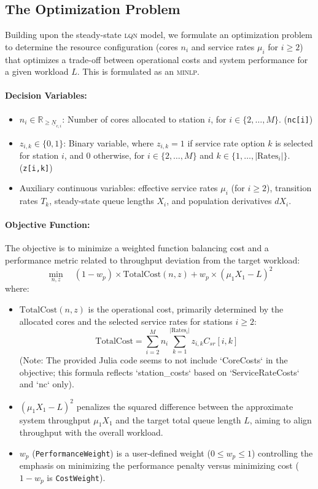 \documentclass{article}
\newcommand{\minlp}{\textsc{minlp}}
\newcommand{\lqn}{\textsc{lqn}}
\begin{document}
\subsection{The Optimization Problem}
\label{subsec:optimization}

Building upon the steady-state \lqn{} model, we formulate an optimization problem to determine the resource configuration (cores \(n_i\) and service rates \(\mu_i\) for \(i \ge 2\)) that optimizes a trade-off between operational costs and system performance for a given workload \(L\). This is formulated as an \minlp{}.

\paragraph{Decision Variables:}
\begin{itemize}
    \item \(n_i \in \mathbb{R}_{\ge \underline{N}_{c,i}}\): Number of cores allocated to station \(i\), for \(i \in \{2, \dots, M\}\). (\texttt{nc[i]})
    \item \(z_{i,k} \in \{0, 1\}\): Binary variable, where \(z_{i,k}=1\) if service rate option \(k\) is selected for station \(i\), and 0 otherwise, for \(i \in \{2, \dots, M\}\) and \(k \in \{1, \dots, |\text{Rates}_i|\}\). (\texttt{z[i,k]})
    \item Auxiliary continuous variables: effective service rates \(\mu_i\) (for \(i \ge 2\)), transition rates \(T_k\), steady-state queue lengths \(X_i\), and population derivatives \(dX_i\).
\end{itemize}

\paragraph{Objective Function:}
The objective is to minimize a weighted function balancing cost and a performance metric related to throughput deviation from the target workload:
\begin{equation}
\label{eq:opt_objective}
\min_{n, z} \quad (1 - w_p) \times \text{TotalCost}(n, z) + w_p \times (\mu_1 X_1 - L)^2
\end{equation}
where:
\begin{itemize}
    \item \(\text{TotalCost}(n, z)\) is the operational cost, primarily determined by the allocated cores and the selected service rates for stations \(i \ge 2\):
    \[ \text{TotalCost} = \sum_{i=2}^M n_i \sum_{k=1}^{|\text{Rates}_i|} z_{i,k} C_{sr}[i,k] \]
    (Note: The provided Julia code seems to not include `CoreCosts` in the objective; this formula reflects `station_costs` based on `ServiceRateCosts` and `nc` only).
    \item \((\mu_1 X_1 - L)^2\) penalizes the squared difference between the approximate system throughput \(\mu_1 X_1\) and the target total queue length \(L\), aiming to align throughput with the overall workload.
    \item \(w_p\) (\texttt{PerformanceWeight}) is a user-defined weight (\(0 \le w_p \le 1\)) controlling the emphasis on minimizing the performance penalty versus minimizing cost (\(1-w_p\) is \texttt{CostWeight}).
\end{itemize}
\end{document}
